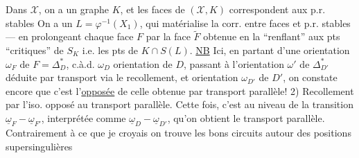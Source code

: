 Dans $\mathcal X$, on a un graphe  $K$, et les faces de $(\mathcal X,K)$ correspondent aux p.r. stables \unsure{\&}  On a un $L=\varphi^{-1}(X_1)$, qui matérialise la corr. entre faces et p.r. stables --- en prolongeant chaque face $F$ par la face $\widetilde F$ obtenue en la ``renflant'' aux pts  ``critiques'' de $S_K$ i.e. les pts de $K\cap S(L)$.
\uline{NB} Ici, en partant d'une orientation $\omega_F$ de $F=\Delta_D^*$, c.à.d. $\omega_D$ orientation de $D$, passant à l'orientation $\omega'$ de $\Delta_{D'}^*$ déduite par transport via le recollement, et  orientation $\omega_{D'}$ de $D'$, on constate encore que c'est l'\uline{opposée} de celle obtenue par transport parallèle!
2) Recollement par l'iso.  opposé au transport parallèle. Cette fois, c'est au niveau de la transition $\underline\omega_F\mathbin{-}\underline\omega_{F'}$, interprétée comme $\underline\omega_D\mathbin{-}\underline\omega_{D'}$, qu'on obtient le transport parallèle. Contrairement à ce que je croyais  on trouve les bons circuits autour des positions supersingulières
